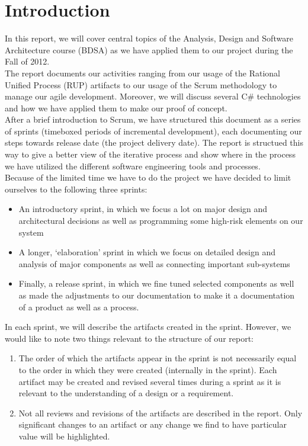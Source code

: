 \section{Introduction}
In this report, we will cover central topics of the Analysis, Design and Software Architecture course (BDSA) as we have applied them to our project during the Fall of 2012.\\
\newline
The report documents our activities ranging from our usage of the Rational Unified Process (RUP) artifacts \cite[p.~31]{OOAD} to our usage of the Scrum methodology to manage our agile development. Moreover, we will discuss several C\# technologies and how we have applied them to make our proof of concept.\\
\newline
After a brief introduction to Scrum, we have structured this document as a series of sprints (timeboxed periods of incremental development), each documenting our steps towards release date (the project delivery date). The report is structued this way to give a better view of the iterative process and show where in the process we have utilized the different software engineering tools and processes.\\
\newline
Because of the limited time we have to do the project we have decided to limit ourselves to the following three sprints:\\
\begin{itemize}
\item An introductory sprint, in which we focus a lot on major design and architectural decisions as well as programming some high-risk elements on our system
\item A longer, ‘elaboration’ sprint in which we focus on detailed design and analysis of major components as well as connecting important sub-systems 
\item Finally, a release sprint, in which we fine tuned selected components as well as made the adjustments to our documentation to make it a documentation of a product as well as a process.
\end{itemize}
In each sprint, we will describe the artifacts created in the sprint. However,
we would like to note two things relevant to the structure of our report:\\
\begin{enumerate}
\item The order of which the artifacts appear in the sprint is not necessarily equal to the
  order in which they were created (internally in the sprint). Each artifact
  may be created and revised several times during a sprint as it is relevant
  to the understanding of a design or a requirement. 
\item Not all reviews and revisions of the artifacts are described in the
  report. Only significant changes to an artifact or any change we find to have particular value will be highlighted.
\end{enumerate}
